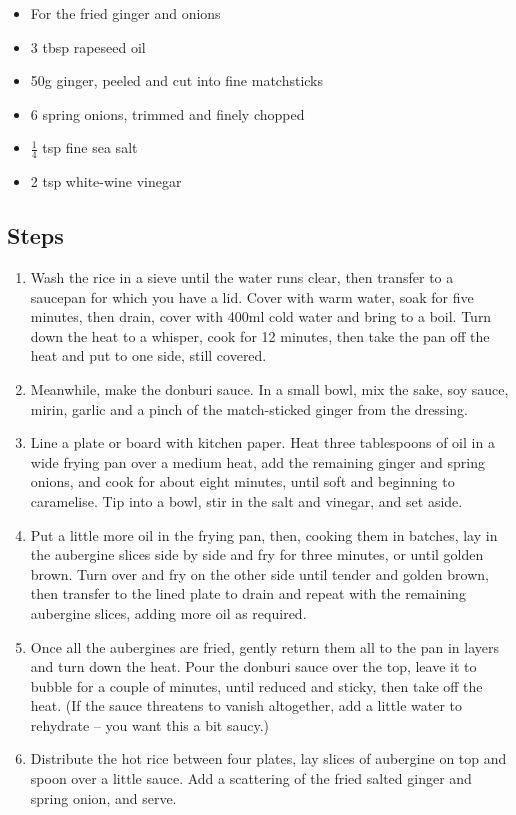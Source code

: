 \documentclass{book}
\begin{document}
\begin{itemize}
\item For the fried ginger and onions
\item 3 tbsp rapeseed oil
\item 50g ginger, peeled and cut into fine matchsticks
\item 6 spring onions, trimmed and finely chopped
\item $\frac{1}{4}$ tsp fine sea salt
\item 2 tsp white-wine vinegar
\end{itemize}

\subsection*{Steps}
\begin{enumerate}
\item Wash the rice in a sieve until the water runs clear, then transfer to a saucepan for which you have a lid. Cover with warm water, soak for five minutes, then drain, cover with 400ml cold water and bring to a boil. Turn down the heat to a whisper, cook for 12 minutes, then take the pan off the heat and put to one side, still covered.
\item Meanwhile, make the donburi sauce. In a small bowl, mix the sake, soy sauce, mirin, garlic and a pinch of the match-sticked ginger from the dressing.
\item Line a plate or board with kitchen paper. Heat three tablespoons of oil in a wide frying pan over a medium heat, add the remaining ginger and spring onions, and cook for about eight minutes, until soft and beginning to caramelise. Tip into a bowl, stir in the salt and vinegar, and set aside.
\item Put a little more oil in the frying pan, then, cooking them in batches, lay in the aubergine slices side by side and fry for three minutes, or until golden brown. Turn over and fry on the other side until tender and golden brown, then transfer to the lined plate to drain and repeat with the remaining aubergine slices, adding more oil as required.
\item Once all the aubergines are fried, gently return them all to the pan in layers and turn down the heat. Pour the donburi sauce over the top, leave it to bubble for a couple of minutes, until reduced and sticky, then take off the heat. (If the sauce threatens to vanish altogether, add a little water to rehydrate – you want this a bit saucy.)
\item Distribute the hot rice between four plates, lay slices of aubergine on top and spoon over a little sauce. Add a scattering of the fried salted ginger and spring onion, and serve.
\end{enumerate}
\newpage
\end{document}
